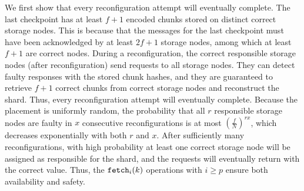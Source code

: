 We first show that every reconfiguration attempt will eventually complete.
The last checkpoint has at least $f+1$ encoded chunks stored on distinct correct storage nodes.
This is because that the \pushss messages for the last checkpoint must have been acknowledged by at least $2f+1$ storage nodes, among which at least $f+1$ are correct nodes.
During a reconfiguration, the correct responsible storage nodes (after reconfiguration) send \getsc requests to all storage nodes.
They can detect faulty responses with the stored chunk hashes, and they are guaranteed to retrieve $f+1$ correct chunks from correct storage nodes and reconstruct the shard.
Thus, every reconfiguration attempt will eventually complete.
Because the placement is uniformly random, the probability that all $r$ responsible storage nodes are faulty in $x$ consecutive reconfigurations is at most $(\frac{f}{N})^{rx}$, which decreases exponentially with both $r$ and $x$.
After sufficiently many reconfigurations, with high probability at least one correct storage node will be assigned as responsible for the shard, and the \retrieve requests will eventually return with the correct value.
Thus, the $\texttt{fetch}_{i}(k)$ operations with $i \geq p$ ensure both availability and safety.